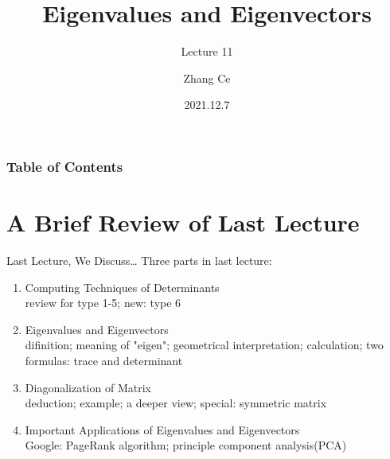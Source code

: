 \documentclass{beamer}
\title[Linear Algebra] %
{Eigenvalues and Eigenvectors}
\subtitle{Lecture 11}
\author[11910803@mail.sustech.edu.cn] %
{
    Zhang Ce
}
\institute[] %
{
    Department of Electrical and Electronic Engineering\\
    Southern University of Science and Technology
}
\date[2021.12.7] %
{2021.12.7}
\begin{document}
\frame{\titlepage}


\begin{frame}
\frametitle{Table of Contents}
\tableofcontents
\end{frame}
\section{A Brief Review of Last Lecture}
\begin{frame}{Last Lecture, We Discuss\dots}
Three parts in last lecture:
    \begin{enumerate}
        \item Computing Techniques of Determinants\\
        review for type 1-5; new: type 6
        \item Eigenvalues and Eigenvectors\\
        difinition; meaning of "eigen"; geometrical interpretation; calculation; two formulas: trace and determinant
        \item Diagonalization of Matrix\\
        deduction; example; a deeper view; special: symmetric matrix
        \item Important Applications of Eigenvalues and Eigenvectors\\
        Google: PageRank algorithm; principle component analysis(PCA)
    \end{enumerate}

\end{frame}
\end{document}
